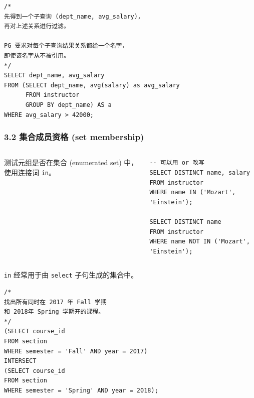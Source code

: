 \documentclass[aspectratio=169, 14pt]{beamer}
\begin{document}
\begin{frame}[fragile]

	\begin{verbatim}
/*
先得到一个子查询 (dept_name, avg_salary)，
再对上述关系进行过滤。

PG 要求对每个子查询结果关系都给一个名字，
即使该名字从不被引用。
*/
SELECT dept_name, avg_salary
FROM (SELECT dept_name, avg(salary) as avg_salary
      FROM instructor
      GROUP BY dept_name) AS a
WHERE avg_salary > 42000;
    \end{verbatim}

\end{frame}

\begin{frame}[fragile]
	\frametitle{3.2 集合成员资格 (set membership)}
	\begin{columns}

		测试元组是否在集合 (enumerated set) 中，使用连接词 \texttt{in}。

		\begin{verbatim}
-- 可以用 or 改写
SELECT DISTINCT name, salary
FROM instructor
WHERE name IN ('Mozart', 'Einstein');

SELECT DISTINCT name
FROM instructor
WHERE name NOT IN ('Mozart', 'Einstein');
    \end{verbatim}

	\end{columns}

\end{frame}

\begin{frame}[fragile]
	\texttt{in} 经常用于由 \texttt{select} 子句生成的集合中。

	\begin{verbatim}
/*
找出所有同时在 2017 年 Fall 学期
和 2018年 Spring 学期开的课程。
*/
(SELECT course_id
FROM section
WHERE semester = 'Fall' AND year = 2017)
INTERSECT
(SELECT course_id
FROM section
WHERE semester = 'Spring' AND year = 2018);
\end{verbatim}

\end{frame}
\end{document}
